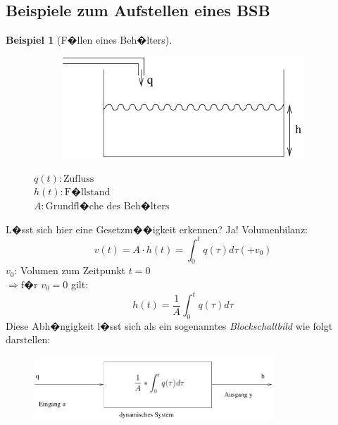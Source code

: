 \documentclass[12pt,a4paper,ngerman]{scrartcl}
\newtheorem{bsp}{Beispiel}[section] %
\begin{document}
\subsection{Beispiele zum Aufstellen eines BSB}
\begin{bsp}[F�llen eines Beh�lters]
\end{bsp}
\begin{figure}[H]%
\begin{minipage}{0.4\linewidth} 
 \begin{figure}[H]
  \includegraphics[width=\linewidth]{sysregel_bsp_1} 
  \end{figure}
\end{minipage}
\begin{minipage}{.6\linewidth}
$q(t):\text{Zufluss}$\\
$h(t):\text{F�llstand}$\\
$A:\text{Grundfl�che des Beh�lters}$
\end{minipage}
\end{figure}
L�sst sich hier eine Gesetzm��igkeit erkennen? Ja! Volumenbilanz:
\begin{equation*}
 v(t)= A \cdot h(t)=\int_0^t{q(\tau)d\tau}(+v_0) 
\end{equation*}
$v_0$: Volumen zum Zeitpunkt $t=0$ \\$\Rightarrow \text{f�r } v_0 = 0$ gilt:
\begin{equation*}
h(t)=\frac{1}{A}\int_0^t{q(\tau)d\tau}
\end{equation*}
Diese Abh�ngigkeit l�sst sich als ein sogenanntes \emph{Blockschaltbild} wie folgt darstellen:
\begin{figure}[h!]
\includegraphics[width=9cm]{sysregel_bsb1}
\end{figure}
\end{document}
